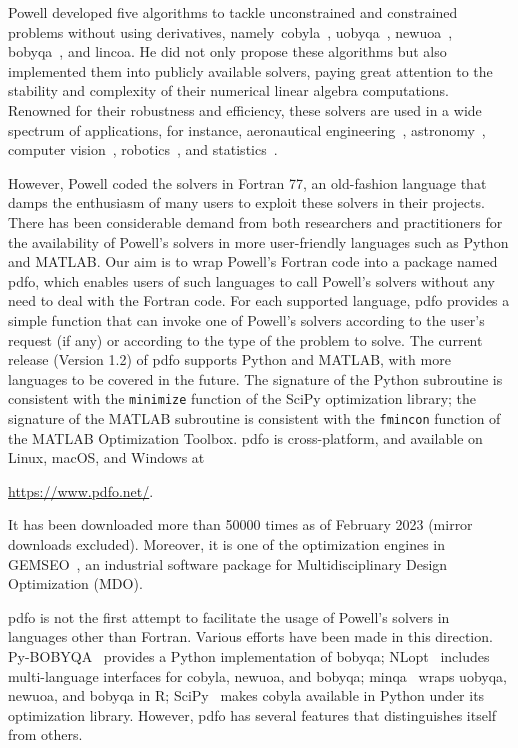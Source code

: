 \documentclass[
    smallextended,  %
    final,        %
]{svjour3}
\begin{document}
Powell developed five algorithms to tackle unconstrained and constrained problems without using derivatives, namely~\gls{cobyla}~\cite{Powell_1994}, \gls{uobyqa}~\cite{Powell_2002}, \gls{newuoa}~\cite{Powell_2006}, \gls{bobyqa}~\cite{Powell_2009}, and \gls{lincoa}.
He did not only propose these algorithms but also implemented them into publicly available solvers, paying great attention to the stability and complexity of their numerical linear algebra computations.
Renowned for their robustness and efficiency, these solvers are used in a wide spectrum of applications, for instance, aeronautical engineering~\cite{Gallard_Etal_2018}, astronomy~\cite{Biviano_Etal_2013,Mamon_Biviano_Boue_2013}, computer vision~\cite{Izadinia_Shan_Seitz_2017}, robotics~\cite{Mombaur_Truong_Laumond_2010}, and statistics~\cite{Bates_Etal_2015}.

However, Powell coded the solvers in Fortran 77, an old-fashion language that damps the enthusiasm of many users to exploit these solvers in their projects.
There has been considerable demand from both researchers and practitioners for the availability of Powell's solvers in more user-friendly languages such as Python and MATLAB.
Our aim is to wrap Powell's Fortran code into a package named \gls{pdfo}, which enables users of such languages to call Powell's solvers without any need to deal with the Fortran code.
For each supported language, \gls{pdfo} provides a simple function that can invoke one of Powell's solvers according to the user's request (if any) or according to the type of the problem to solve.
The current release (Version 1.2) of \gls{pdfo} supports Python and MATLAB, with more languages to be covered in the future.
The signature of the Python subroutine is consistent with the \texttt{minimize} function of the SciPy optimization library; the signature of the MATLAB subroutine is consistent with the \texttt{fmincon} function of the MATLAB Optimization Toolbox.
\gls{pdfo} is cross-platform, and available on Linux, macOS, and Windows at
\begin{center}
    \url{https://www.pdfo.net/}.
\end{center}
It has been downloaded more than \num{50000} times as of February 2023 (mirror downloads excluded).
Moreover, it is one of the optimization engines in GEMSEO~\cite{Gallard_Etal_2018},
an industrial software package for Multidisciplinary Design Optimization (MDO).

\Gls{pdfo} is not the first attempt to facilitate the usage of Powell's solvers in languages other than Fortran.
Various efforts have been made in this direction.
Py-BOBYQA~\cite{Cartis_Etal_2019,Cartis_Roberts_Sheridan-Methven_2022} provides a Python implementation of \gls{bobyqa}; NLopt~\cite{Johnson_2019} includes multi-language interfaces for \gls{cobyla}, \gls{newuoa}, and \gls{bobyqa}; minqa~\cite{Bates_Etal_2014} wraps \gls{uobyqa}, \gls{newuoa}, and \gls{bobyqa} in R; SciPy~\cite{Virtanen_Etal_2020} makes \gls{cobyla} available in Python under its optimization library.
However, \gls{pdfo} has several features that distinguishes itself from others.
\end{document}
